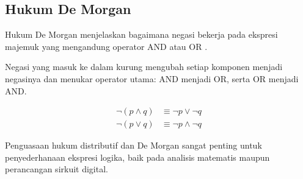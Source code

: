 \subsection{Hukum De Morgan}

Hukum De Morgan menjelaskan bagaimana negasi bekerja pada ekspresi majemuk yang mengandung operator AND atau OR \cite{wiki_proplogic}.

\begin{teorema}
Negasi yang masuk ke dalam kurung mengubah setiap komponen menjadi negasinya dan menukar operator utama: AND menjadi OR, serta OR menjadi AND.
\end{teorema}

\begin{align*}
    \neg(p \wedge q) &\equiv \neg p \vee \neg q \\
    \neg(p \vee q) &\equiv \neg p \wedge \neg q
\end{align*}

Penguasaan hukum distributif dan De Morgan sangat penting untuk penyederhanaan ekspresi logika, baik pada analisis matematis maupun perancangan sirkuit digital.

